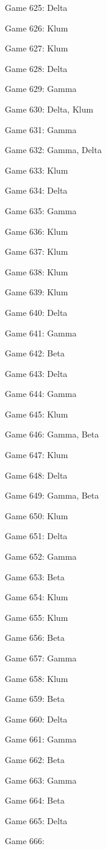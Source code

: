 \documentclass{article}
\begin{document}
\begin{multicols}{3}
\begin{compactitem}
\item Game 625:
Delta
\item Game 626:
Klum
\item Game 627:
Klum
\item Game 628:
Delta
\item Game 629:
Gamma
\item Game 630:
Delta, Klum
\item Game 631:
Gamma
\item Game 632:
Gamma, Delta
\item Game 633:
Klum
\item Game 634:
Delta
\item Game 635:
Gamma
\item Game 636:
Klum
\item Game 637:
Klum
\item Game 638:
Klum
\item Game 639:
Klum
\item Game 640:
Delta
\item Game 641:
Gamma
\item Game 642:
Beta
\item Game 643:
Delta
\item Game 644:
Gamma
\item Game 645:
Klum
\item Game 646:
Gamma, Beta
\item Game 647:
Klum
\item Game 648:
Delta
\item Game 649:
Gamma, Beta
\item Game 650:
Klum
\item Game 651:
Delta
\item Game 652:
Gamma
\item Game 653:
Beta
\item Game 654:
Klum
\item Game 655:
Klum
\item Game 656:
Beta
\item Game 657:
Gamma
\item Game 658:
Klum
\item Game 659:
Beta
\item Game 660:
Delta
\item Game 661:
Gamma
\item Game 662:
Beta
\item Game 663:
Gamma
\item Game 664:
Beta
\item Game 665:
Delta
\item Game 666:

\end{compactitem}
\end{multicols}
\end{document}
